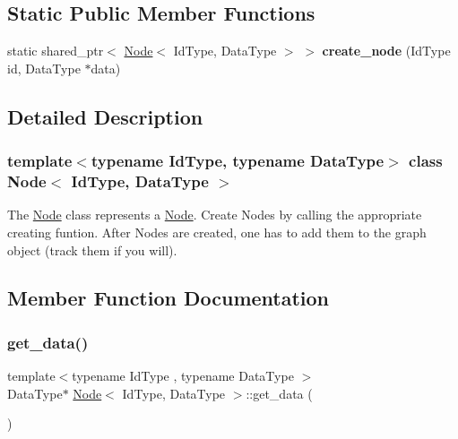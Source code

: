 \subsection*{Static Public Member Functions}
\begin{DoxyCompactItemize}
\item 
\mbox{\label{class_node_adfb73b3f9101049a2d1061d5e9c6f917}} 
static shared\+\_\+ptr$<$ \hyperlink{class_node}{Node}$<$ Id\+Type, Data\+Type $>$ $>$ {\bfseries create\+\_\+node} (Id\+Type id, Data\+Type $\ast$data)
\end{DoxyCompactItemize}


\subsection{Detailed Description}
\subsubsection*{template$<$typename Id\+Type, typename Data\+Type$>$\newline
class Node$<$ Id\+Type, Data\+Type $>$}

The \hyperlink{class_node}{Node} class represents a \hyperlink{class_node}{Node}. Create Nodes by calling the appropriate creating funtion. After Nodes are created, one has to add them to the graph object (track them if you will). 

\subsection{Member Function Documentation}
\mbox{\label{class_node_abd0500a7483af56c57087d408a0dd46d}} 
\subsubsection{\texorpdfstring{get\+\_\+data()}{get\_data()}}
{\footnotesize\ttfamily template$<$typename Id\+Type , typename Data\+Type $>$ \\
Data\+Type$\ast$ \hyperlink{class_node}{Node}$<$ Id\+Type, Data\+Type $>$\+::get\+\_\+data (\begin{DoxyParamCaption}{ }\end{DoxyParamCaption})\hspace{0.3cm}{\ttfamily [inline]}}


